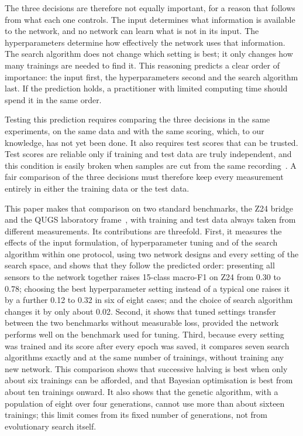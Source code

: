 \documentclass[11pt,a4paper]{article}
\begin{document}
The three decisions are therefore not equally important, for a reason that follows from what each one controls. The input determines what information is available to the network, and no network can learn what is not in its input. The hyperparameters determine how effectively the network uses that information. The search algorithm does not change which setting is best; it only changes how many trainings are needed to find it. This reasoning predicts a clear order of importance: the input first, the hyperparameters second and the search algorithm last. If the prediction holds, a practitioner with limited computing time should spend it in the same order.

Testing this prediction requires comparing the three decisions in the same experiments, on the same data and with the same scoring, which, to our knowledge, has not yet been done. It also requires test scores that can be trusted. Test scores are reliable only if training and test data are truly independent, and this condition is easily broken when samples are cut from the same recording~\cite{kapoor2023}. A fair comparison of the three decisions must therefore keep every measurement entirely in either the training data or the test data.

This paper makes that comparison on two standard benchmarks, the Z24 bridge~\cite{maeck2003,reynders2009} and the QUGS laboratory frame~\cite{abdeljaber2017}, with training and test data always taken from different measurements. Its contributions are threefold. First, it measures the effects of the input formulation, of hyperparameter tuning and of the search algorithm within one protocol, using two network designs and every setting of the search space, and shows that they follow the predicted order: presenting all sensors to the network together raises 15-class macro-F1 on Z24 from 0.30 to 0.78; choosing the best hyperparameter setting instead of a typical one raises it by a further 0.12 to 0.32 in six of eight cases; and the choice of search algorithm changes it by only about 0.02. Second, it shows that tuned settings transfer between the two benchmarks without measurable loss, provided the network performs well on the benchmark used for tuning. Third, because every setting was trained and its score after every epoch was saved, it compares seven search algorithms exactly and at the same number of trainings, without training any new network. This comparison shows that successive halving is best when only about six trainings can be afforded, and that Bayesian optimisation is best from about ten trainings onward. It also shows that the genetic algorithm, with a population of eight over four generations, cannot use more than about sixteen trainings; this limit comes from its fixed number of generations, not from evolutionary search itself.
\end{document}
